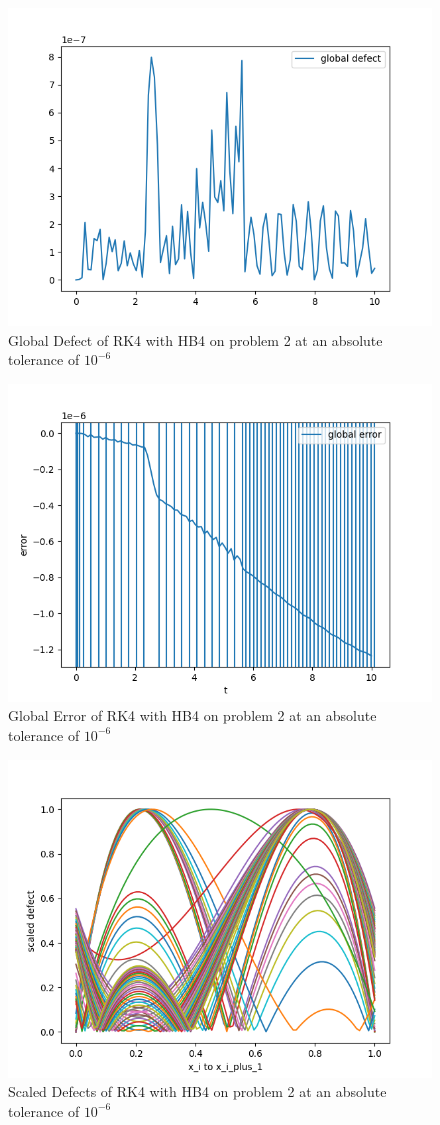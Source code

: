 \documentclass{article}
\begin{document}
\begin{figure}[H]
\centering
\includegraphics[width=0.7\linewidth]{./figures/rk4_with_hb4_p2_global_defect}
\caption{Global Defect of RK4 with HB4 on problem 2 at an absolute tolerance of $10^{-6}$}
\label{fig:rk4_with_hb4_p2_global_defect}
\end{figure}

\begin{figure}[H]
\centering
\includegraphics[width=0.7\linewidth]{./figures/rk4_with_hb4_p2_global_error}
\caption{Global Error of RK4 with HB4 on problem 2 at an absolute tolerance of $10^{-6}$}
\label{fig:rk4_with_hb4_p2_global_error}
\end{figure}

\begin{figure}[H]
\centering
\includegraphics[width=0.7\linewidth]{./figures/rk4_with_hb4_p2_scaled_defects}
\caption{Scaled Defects of RK4 with HB4 on problem 2 at an absolute tolerance of $10^{-6}$}
\label{fig:rk4_with_hb4_p2_scaled_defects}
\end{figure}
\end{document}
